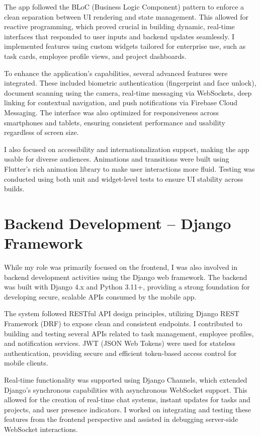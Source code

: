 The app followed the BLoC (Business Logic Component) pattern to enforce a clean separation between UI rendering and state management. This allowed for reactive programming, which proved crucial in building dynamic, real-time interfaces that responded to user inputs and backend updates seamlessly. I implemented features using custom widgets tailored for enterprise use, such as task cards, employee profile views, and project dashboards.

To enhance the application's capabilities, several advanced features were integrated. These included biometric authentication (fingerprint and face unlock), document scanning using the camera, real-time messaging via WebSockets, deep linking for contextual navigation, and push notifications via Firebase Cloud Messaging. The interface was also optimized for responsiveness across smartphones and tablets, ensuring consistent performance and usability regardless of screen size.

I also focused on accessibility and internationalization support, making the app usable for diverse audiences. Animations and transitions were built using Flutter's rich animation library to make user interactions more fluid. Testing was conducted using both unit and widget-level tests to ensure UI stability across builds.

\section{Backend Development – Django Framework}

While my role was primarily focused on the frontend, I was also involved in backend development activities using the Django web framework. The backend was built with Django 4.x and Python 3.11+, providing a strong foundation for developing secure, scalable APIs consumed by the mobile app.

The system followed RESTful API design principles, utilizing Django REST Framework (DRF) to expose clean and consistent endpoints. I contributed to building and testing several APIs related to task management, employee profiles, and notification services. JWT (JSON Web Tokens) were used for stateless authentication, providing secure and efficient token-based access control for mobile clients.

Real-time functionality was supported using Django Channels, which extended Django’s synchronous capabilities with asynchronous WebSocket support. This allowed for the creation of real-time chat systems, instant updates for tasks and projects, and user presence indicators. I worked on integrating and testing these features from the frontend perspective and assisted in debugging server-side WebSocket interactions.

